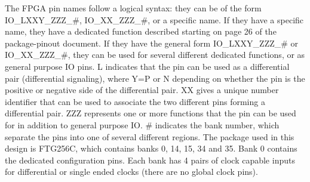 The FPGA pin names follow a logical syntax: they can be of the form IO\_LXXY\_ZZZ\_\#,
IO\_XX\_ZZZ\_\#, or a specific name. If they have a specific name, they have a dedicated function
described starting on page 26 of the package-pinout document. If they have the general form
IO\_LXXY\_ZZZ\_\# or IO\_XX\_ZZZ\_\#, they can be used for several different dedicated functions, or
as general purpose IO pins. L indicates that the pin can be used as a differential pair
(differential signaling), where Y=P or N depending on whether the pin is the positive or negative
side of the differential pair. XX gives a unique number identifier that can be used to associate the
two different pins forming a differential pair. ZZZ represents one or more functions that the pin
can be used for in addition to general purpose IO\@. \# indicates the bank number, which separate
the pins into one of several different regions. The package used in this design is FTG256C, which
contains banks 0, 14, 15, 34 and 35. Bank 0 contains the dedicated configuration pins. Each bank has
4 pairs of clock capable inputs for differential or single ended clocks (there are no global clock
pins).


